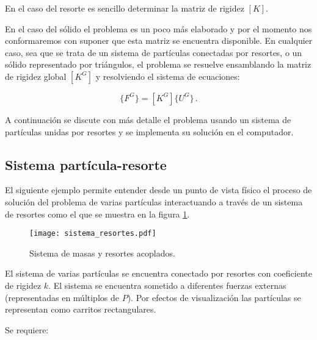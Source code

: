 En el caso del resorte es sencillo determinar la matriz de rigidez $[K]$.

En el caso del sólido el problema es un poco más elaborado y por el momento nos 
conformaremos con suponer que esta matriz se encuentra disponible. En cualquier 
caso, sea que se trata de un sistema de partículas conectadas por resortes, o 
un sólido representado por triángulos, el problema se resuelve ensamblando la 
matriz de rigidez global $[K^G]$ y resolviendo el sistema de ecuaciones:

\begin{equation}
\{ F^G \} = [ K^G ] \{ U^G \}\, .
\end{equation}

A continuación se discute con más detalle el problema usando un sistema de 
partículas unidas por resortes y se implementa su solución en el computador.

\subsection{Sistema partícula-resorte}
El siguiente ejemplo permite entender desde un punto de vista físico el proceso 
de solución del problema de varias partículas interactuando a través de un 
sistema de resortes como el que se muestra en la figura 
\ref{fig:sistema_resortes}.
\begin{figure}[H]
\centering
\texttt{[image: sistema\_resortes.pdf]}
\caption{Sistema de masas y resortes acoplados.}
\label{fig:sistema_resortes}
\end{figure}

El sistema de varias partículas se encuentra conectado por resortes con 
coeficiente de rigidez $k$. El sistema se encuentra sometido a diferentes 
fuerzas externas (representadas en múltiplos de $P$). Por efectos de 
visualización las partículas se representan como carritos rectangulares.

Se requiere:

